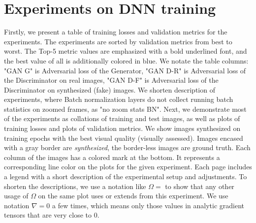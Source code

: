 \clearpage
\newpage

\section{Experiments on DNN training}
\label{appb:exps}

Firstly, we present a table of training losses and validation metrics for the experiments. The experiments are sorted by validation metrics from best to worst. The Top-5 metric values are emphasized with a bold underlined font, and the best value of all is additionally colored in blue. We notate the table columns: "GAN G" is Adversarial loss of the Generator, "GAN D-R" is Adversarial loss of the Discriminator on real images, "GAN D-F" is Adversarial loss of the Discriminator on synthesized (fake) images. We shorten description of experiments, where Batch normalization layers do not collect running batch statistics on zoomed frames, as "no zoom stats BN". Next, we demonstrate most of the experiments as collations of training and test images, as well as plots of training losses and plots of validation metrics. We show images synthesized on training epochs with the best visual quality (visually assessed). Images encased with a gray border are \textit{synthesized}, the border-less images are ground truth. Each column of the images has a colored mark at the bottom. It represents a corresponding line color on the plots for the given experiment. Each page includes a legend with a short description of the experimental setup and adjustments. To shorten the descriptions, we use a notation like $\Omega=$ to show that any other usage of $\Omega$ on the same plot uses or extends from this experiment. We use notation $\nabla=0$ a few times, which means only those values in analytic gradient tensors that are very close to 0.


